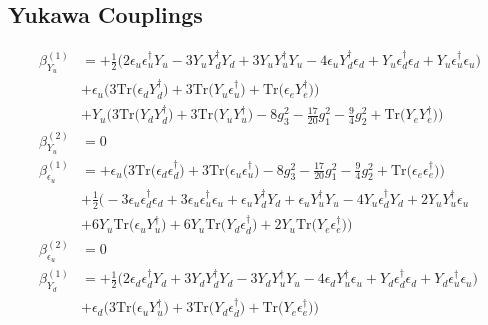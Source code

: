 \subsection{Yukawa Couplings}
{\allowdisplaybreaks  \begin{align} 
\beta_{Y_u}^{(1)} & =  
+\frac{1}{2} \Big(2 {\epsilon_u  \epsilon_{u}^{\dagger}  Y_u}  -3 {Y_u  Y_{d}^{\dagger}  Y_d}  + 3 {Y_u  Y_{u}^{\dagger}  Y_u}  -4 {\epsilon_u  Y_{d}^{\dagger}  \epsilon_d}  + {Y_u  \epsilon_{d}^{\dagger}  \epsilon_d} + {Y_u  \epsilon_{u}^{\dagger}  \epsilon_u}\Big)\nonumber \\ 
 &+\epsilon_u \Big(3 \mbox{Tr}\Big({\epsilon_d  Y_{d}^{\dagger}}\Big)  + 3 \mbox{Tr}\Big({Y_u  \epsilon_{u}^{\dagger}}\Big)  + \mbox{Tr}\Big({\epsilon_e  Y_{e}^{\dagger}}\Big)\Big)\nonumber \\ 
 &+Y_u \Big(3 \mbox{Tr}\Big({Y_d  Y_{d}^{\dagger}}\Big)  + 3 \mbox{Tr}\Big({Y_u  Y_{u}^{\dagger}}\Big)  -8 g_{3}^{2}  -\frac{17}{20} g_{1}^{2}  -\frac{9}{4} g_{2}^{2}  + \mbox{Tr}\Big({Y_e  Y_{e}^{\dagger}}\Big)\Big)\\ 
\beta_{Y_u}^{(2)} & =  
0\\ 
\beta_{\epsilon_u}^{(1)} & =  
+\epsilon_u \Big(3 \mbox{Tr}\Big({\epsilon_d  \epsilon_{d}^{\dagger}}\Big)  + 3 \mbox{Tr}\Big({\epsilon_u  \epsilon_{u}^{\dagger}}\Big)  -8 g_{3}^{2}  -\frac{17}{20} g_{1}^{2}  -\frac{9}{4} g_{2}^{2}  + \mbox{Tr}\Big({\epsilon_e  \epsilon_{e}^{\dagger}}\Big)\Big)\nonumber \\ 
 &+\frac{1}{2} \Big(-3 {\epsilon_u  \epsilon_{d}^{\dagger}  \epsilon_d} +3 {\epsilon_u  \epsilon_{u}^{\dagger}  \epsilon_u} +{\epsilon_u  Y_{d}^{\dagger}  Y_d}+{\epsilon_u  Y_{u}^{\dagger}  Y_u}-4 {Y_u  \epsilon_{d}^{\dagger}  Y_d} +2 {Y_u  Y_{u}^{\dagger}  \epsilon_u} \nonumber \\ 
 &+6 Y_u \mbox{Tr}\Big({\epsilon_u  Y_{u}^{\dagger}}\Big) +6 Y_u \mbox{Tr}\Big({Y_d  \epsilon_{d}^{\dagger}}\Big) +2 Y_u \mbox{Tr}\Big({Y_e  \epsilon_{e}^{\dagger}}\Big) \Big)\\ 
\beta_{\epsilon_u}^{(2)} & =  
0\\ 
\beta_{Y_d}^{(1)} & =  
+\frac{1}{2} \Big(2 {\epsilon_d  \epsilon_{d}^{\dagger}  Y_d}  + 3 {Y_d  Y_{d}^{\dagger}  Y_d}  -3 {Y_d  Y_{u}^{\dagger}  Y_u}  -4 {\epsilon_d  Y_{u}^{\dagger}  \epsilon_u}  + {Y_d  \epsilon_{d}^{\dagger}  \epsilon_d} + {Y_d  \epsilon_{u}^{\dagger}  \epsilon_u}\Big)\nonumber \\ 
 &+\epsilon_d \Big(3 \mbox{Tr}\Big({\epsilon_u  Y_{u}^{\dagger}}\Big)  + 3 \mbox{Tr}\Big({Y_d  \epsilon_{d}^{\dagger}}\Big)  + \mbox{Tr}\Big({Y_e  \epsilon_{e}^{\dagger}}\Big)\Big)\nonumber \\ 

\end{align}}
